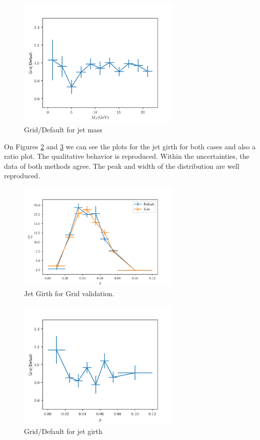 \begin{figure}
\includegraphics[width=0.7\textwidth]{images/grid_default_mass.png}
\caption[Grid/Default for jet mass]{Grid/Default for jet mass}
\label{grid_default_jetmass}
\end{figure}

On Figures \ref{grid_girth_validation} and \ref{grid_default_girth} we can see the plots for the jet girth for both cases and also a ratio plot. The qualitative behavior is reproduced. Within the uncertainties, the data of both methods agree. The peak and width of the distribution are well reproduced.

\begin{figure}
\includegraphics[width=0.7\textwidth]{images/grid_girth_validation.png}
\caption[Jet Girth for Grid validation.]{Jet Girth for Grid validation.}
\label{grid_girth_validation}
\end{figure}

\begin{figure}
\includegraphics[width=0.7\textwidth]{images/grid_default_girth.png}
\caption[Grid/Default for jet girth]{Grid/Default for jet girth}
\label{grid_default_girth}
\end{figure}


